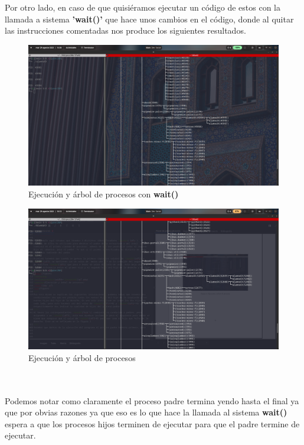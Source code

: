 \documentclass[11pt]{article}
\begin{document}
\\\\
Por otro lado, en caso de que quisiéramos ejecutar un código de estos con la llamada a sistema \textbf{'wait()'} que hace unos cambios en el código, donde al quitar las instrucciones comentadas nos produce los siguientes resultados. 
\begin{figure}
\centering
\includegraphics[width=\linewidth]{p6v2.png}
\caption{Ejecución y árbol de procesos con \textbf{wait()}}
\label{img: p6v2}
\end{figure}
\begin{figure}
\centering
\includegraphics[width=\linewidth]{p7.png}
\caption{Ejecución y árbol de procesos}
\label{img: p7}
\end{figure}
\\\\
Podemos notar como claramente el proceso padre termina yendo hasta el final ya que por obvias razones ya que eso es lo que hace la llamada al sistema \textbf{wait()} espera a que los procesos hijos terminen de ejecutar para que el padre termine de ejecutar. 
\\\\
\end{document}
